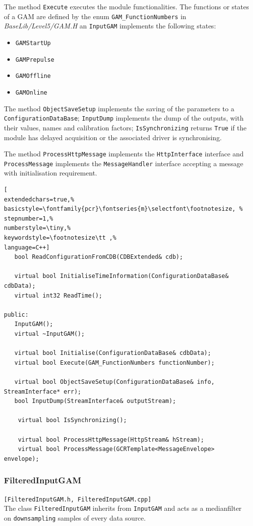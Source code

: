 The method \texttt{Execute} executes the module functionalities. The functions or states of a GAM are defined by the enum \texttt{GAM\_FunctionNumbers} in \textit{BaseLib/Level5/GAM.H} an \texttt{InputGAM} implements the following states:
\begin{itemize}
 \item \texttt{GAMStartUp}
 \item \texttt{GAMPrepulse}
 \item \texttt{GAMOffline}
 \item \texttt{GAMOnline}
\end{itemize}

The method \texttt{ObjectSaveSetup} implements the saving of the parameters to a \texttt{ConfigurationDataBase}; \texttt{InputDump} implements the dump of the outputs, with their values, names and calibration factors; \texttt{IsSynchronizing} returns \texttt{True} if the module has delayed acquisition or the associated driver is synchronising.

The method \texttt{ProcessHttpMessage} implements the \texttt{HttpInterface} interface and \texttt{ProcessMessage} implements the \texttt{MessageHandler} interface accepting a message with initialisation requirement.

\begin{lstlisting}[
extendedchars=true,%
basicstyle=\fontfamily{pcr}\fontseries{m}\selectfont\footnotesize, %
stepnumber=1,%
numberstyle=\tiny,%
keywordstyle=\footnotesize\tt ,%
language=C++]
   bool ReadConfigurationFromCDB(CDBExtended& cdb);

   virtual bool InitialiseTimeInformation(ConfigurationDataBase& cdbData);
   virtual int32 ReadTime();

public:
   InputGAM();
   virtual ~InputGAM();

   virtual bool Initialise(ConfigurationDataBase& cdbData);
   virtual bool Execute(GAM_FunctionNumbers functionNumber);

   virtual bool ObjectSaveSetup(ConfigurationDataBase& info, StreamInterface* err);
   bool InputDump(StreamInterface& outputStream);

    virtual bool IsSynchronizing();

    virtual bool ProcessHttpMessage(HttpStream& hStream);
    virtual bool ProcessMessage(GCRTemplate<MessageEnvelope> envelope);
\end{lstlisting}



\subsubsection{FilteredInputGAM}
\texttt{[FilteredInputGAM.h, FilteredInputGAM.cpp]}\\
The class \texttt{FilteredInputGAM} inherits from \texttt{InputGAM} and acts as a medianfilter on \texttt{downsampling} samples of every data source. \\

